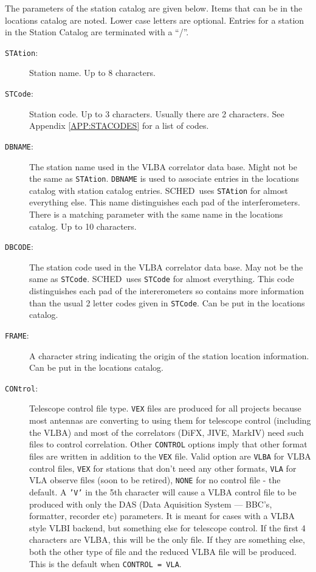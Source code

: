 \documentclass{report}
\newcommand{\schedb}{{\sc SCHED~}}
\begin{document}
The parameters of the station catalog are given below.  Items that can
be in the locations catalog are noted.  Lower case letters are
optional.  Entries for a station in the Station Catalog are terminated with
a ``/''.

\begin{description}
\item [{\tt STAtion}:] Station name. Up to 8 characters.

\item [{\tt STCode}:] Station code. Up to 3 characters.  Usually there
are 2 characters.  See Appendix \ref{APP:STACODES} for a list
of codes.

\item [{\tt DBNAME}:] The station name used in the VLBA correlator
data base.  Might not be the same as {\tt STAtion}.  {\tt DBNAME} is
used to associate entries in the locations catalog with station
catalog entries.  \schedb uses {\tt STAtion} for almost everything
else.  This name distinguishes each pad of the interferometers.
There is a matching parameter with the same name in the locations
catalog.  Up to 10 characters.

\item [{\tt DBCODE}:] The station code used in the VLBA correlator
data base.  May not be the same as {\tt STCode}.  \schedb uses
{\tt STCode} for almost everything.  This code distinguishes each
pad of the intererometers so contains more information than the
usual 2 letter codes given in {\tt STCode}.  Can be put in the
locations catalog.

\item [{\tt FRAME}:] A character string indicating the origin
of the station location information.  Can be put in the locations
catalog.

\item [{\tt CONtrol}:] Telescope control file type. {\tt VEX} files
are produced for all projects because most antennas are converting
to using them for telescope control (including the VLBA) and most
of the correlators (DiFX, JIVE, MarkIV) need such files to control
correlation.  Other {\tt CONTROL} options imply that other format
files are written in addition to the {\tt VEX} file.  Valid option are
{\tt VLBA} for VLBA control files,
{\tt VEX} for stations that don't need any other formats,
{\tt VLA} for VLA observe files (soon to be retired),
{\tt NONE} for no control file - the default.
A {\tt 'V'} in the 5th character will cause a VLBA
control file to be produced with only the DAS (Data Aquisition System
--- BBC's, formatter, recorder etc) parameters.  It is meant for
cases with a VLBA style VLBI backend, but something else for telescope
control.  If the first
4 characters are VLBA, this will be the only file.  If they are
something else, both the other type of file and the reduced VLBA file
will be produced.  This is the default when {\tt CONTROL = VLA}.


\end{description}
\end{document}
